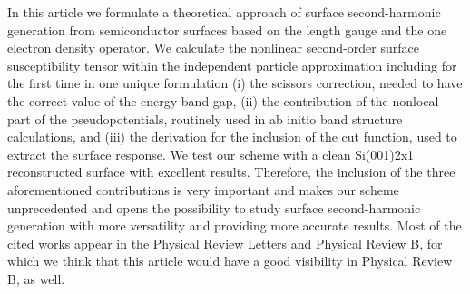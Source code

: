 In this article we formulate a theoretical approach of surface
second-harmonic generation from semiconductor surfaces based on the
length gauge and the one electron density operator.  We calculate the
nonlinear second-order surface susceptibility tensor within the
independent particle approximation including for the first time in one
unique formulation (i) the scissors correction, needed to have the
correct value of the energy band gap, (ii) the contribution of the
nonlocal part of the pseudopotentials, routinely used in ab initio
band structure calculations, and (iii) the derivation for the
inclusion of the cut function, used to extract the surface response.
We test our scheme with a clean Si(001)2x1 reconstructed surface with
excellent results.  Therefore, the inclusion of the three
aforementioned contributions is very important and makes our scheme
unprecedented and opens the possibility to study surface
second-harmonic generation with more versatility and providing more
accurate results.  Most of the cited works appear in the Physical
Review Letters and Physical Review B, for which we think that this
article would have a good visibility in Physical Review B, as well.

